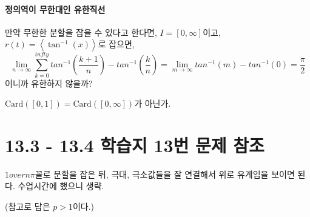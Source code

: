 \paragraph{정의역이 무한대인 유한직선}
만약 무한한 분할을 잡을 수 있다고 한다면,
$I = [0, \infty] $이고, $r(t) = \left\langle \tan^{-1}(x) \right\rangle$로 잡으면,
$$\lim_{n \to \infty} \sum_{k=0}^{infty} tan^{-1}(\frac{k+1}{n}) - tan^{-1}(\frac{k}{n}) = \lim_{m \to \infty} tan^{-1}(m) - tan^{-1}(0) = \frac{\pi}{2} $$
이니까 유한하지 않을까?

$\mathrm{Card}([0,1]) = \mathrm{Card}([0,\infty])$가 아닌가.

\section{13.3 - 13.4 학습지 13번 문제 참조}

$1 over {n \pi}$꼴로 분할을 잡은 뒤, 극대, 극소값들을 잘 연결해서 위로 유계임을 보이면 된다. 수업시간에 했으니 생략.

(참고로 답은 $p>1$이다.)

